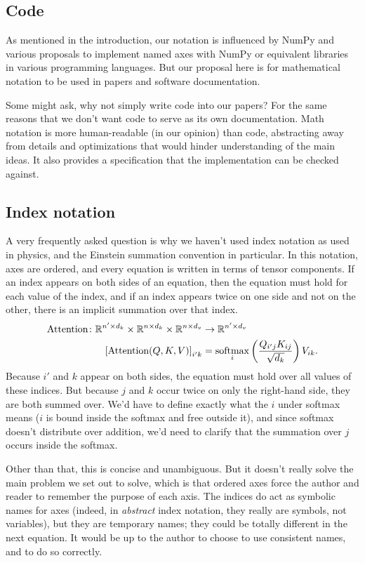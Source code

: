 \subsection{Code}

As mentioned in the introduction, our notation is influenced by NumPy and various proposals to implement named axes with NumPy or equivalent libraries in various programming languages. But our proposal here is for mathematical notation to be used in papers and software documentation.

Some might ask, why not simply write code into our papers? For the same reasons that we don't want code to serve as its own documentation. Math notation is more human-readable (in our opinion) than code, abstracting away from details and optimizations that would hinder understanding of the main ideas. It also provides a specification that the implementation can be checked against.

\subsection{Index notation}

A very frequently asked question is why we haven't used index notation as used in physics, and the Einstein summation convention in particular. In this notation, axes are ordered, and every equation is written in terms of tensor components.
If an index appears on both sides of an equation, then the equation must hold for each value of the index, and if an index appears twice on one side and not on the other, there is an implicit summation over that index.
\begin{align*}
  \text{Attention} \colon \mathbb{R}^{n' \times d_k} \times \mathbb{R}^{n \times d_k} \times \mathbb{R}^{n \times d_v} &\rightarrow \mathbb{R}^{n' \times d_v} \\
  \left[\text{Attention}(Q, K, V)\right]_{i'k} &= \operatorname*{softmax}_i \left( \frac{Q_{i'j} K_{ij}}{\sqrt{d_k}} \right) V_{ik}.
\end{align*}
Because $i'$ and $k$ appear on both sides, the equation must hold over all values of these indices. But because $j$ and $k$ occur twice on only the right-hand side, they are both summed over. We'd have to define exactly what the $i$ under softmax means ($i$ is bound inside the softmax and free outside it), and since softmax doesn't distribute over addition, we'd need to clarify that the summation over $j$ occurs inside the softmax.

Other than that, this is concise and unambiguous. But it doesn't really solve the main problem we set out to solve, which is that ordered axes force the author and reader to remember the purpose of each axis. The indices do act as symbolic names for axes (indeed, in \emph{abstract} index notation, they really are symbols, not variables), but they are temporary names; they could be totally different in the next equation. It would be up to the author to choose to use consistent names, and to do so correctly.

